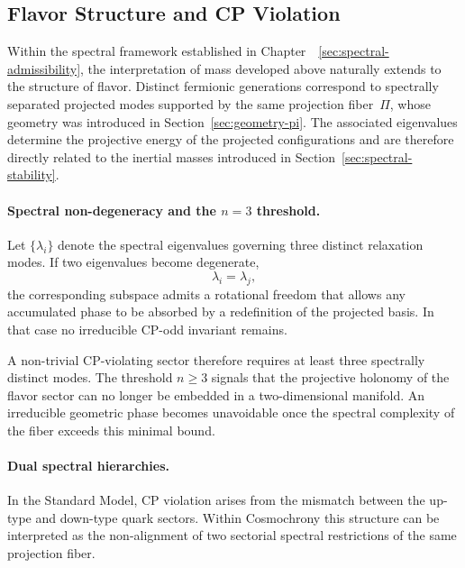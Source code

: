 \subsection{Flavor Structure and CP Violation}
  \label{subsec:flavor-structure-cp}

  Within the spectral framework established in Chapter~~\ref{sec:spectral-admissibility},
  the interpretation of mass developed above naturally extends to the
  structure of flavor.
  Distinct fermionic generations correspond to spectrally separated
  projected modes supported by the same projection fiber~$\Pi$,
  whose geometry was introduced in Section~\ref{sec:geometry-pi}.
  The associated eigenvalues determine the projective energy of the
  projected configurations and are therefore directly related to the
  inertial masses introduced in Section~\ref{sec:spectral-stability}.

  \paragraph{Spectral non-degeneracy and the $n=3$ threshold.}

    Let $\{\lambda_i\}$ denote the spectral eigenvalues governing three
    distinct relaxation modes.
    If two eigenvalues become degenerate,
    \[
      \lambda_i = \lambda_j ,
    \]
    the corresponding subspace admits a rotational freedom that allows any
    accumulated phase to be absorbed by a redefinition of the projected
    basis.
    In that case no irreducible CP-odd invariant remains.

    A non-trivial CP-violating sector therefore requires at least three
    spectrally distinct modes.
    The threshold $n \ge 3$ signals that the projective holonomy of the
    flavor sector can no longer be embedded in a two-dimensional manifold.
    An irreducible geometric phase becomes unavoidable once the spectral
    complexity of the fiber exceeds this minimal bound.

  \paragraph{Dual spectral hierarchies.}

    In the Standard Model, CP violation arises from the mismatch between
    the up-type and down-type quark sectors.
    Within Cosmochrony this structure can be interpreted as the
    non-alignment of two sectorial spectral restrictions of the same
    projection fiber.

